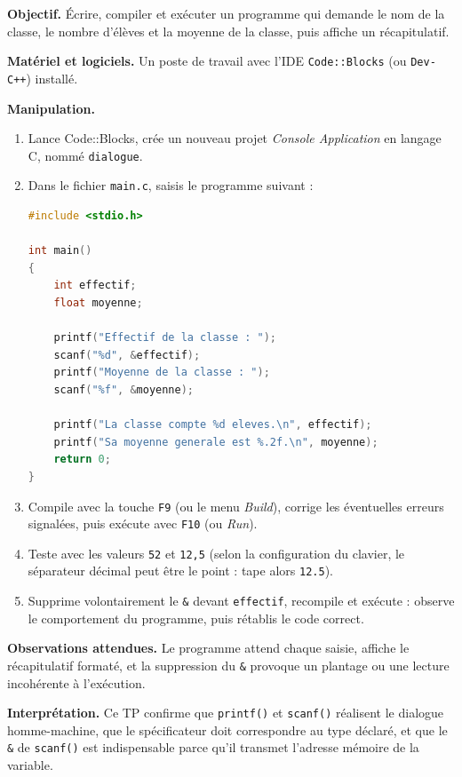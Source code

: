 \documentclass[11pt]{article}
\begin{document}
\begin{experience}
\textbf{Objectif.} Écrire, compiler et exécuter un programme qui demande le nom de la classe, le nombre d'élèves et la moyenne de la classe, puis affiche un récapitulatif.

\textbf{Matériel et logiciels.} Un poste de travail avec l'IDE \texttt{Code::Blocks} (ou \texttt{Dev-C++}) installé.

\textbf{Manipulation.}
\begin{enumerate}
\item Lance Code::Blocks, crée un nouveau projet \emph{Console Application} en langage C, nommé \texttt{dialogue}.
\item Dans le fichier \texttt{main.c}, saisis le programme suivant :
\begin{lstlisting}[language=C]
#include <stdio.h>

int main()
{
    int effectif;
    float moyenne;

    printf("Effectif de la classe : ");
    scanf("%d", &effectif);
    printf("Moyenne de la classe : ");
    scanf("%f", &moyenne);

    printf("La classe compte %d eleves.\n", effectif);
    printf("Sa moyenne generale est %.2f.\n", moyenne);
    return 0;
}
\end{lstlisting}
\item Compile avec la touche \texttt{F9} (ou le menu \emph{Build}), corrige les éventuelles erreurs signalées, puis exécute avec \texttt{F10} (ou \emph{Run}).
\item Teste avec les valeurs \texttt{52} et \texttt{12,5} (selon la configuration du clavier, le séparateur décimal peut être le point : tape alors \texttt{12.5}).
\item Supprime volontairement le \texttt{\&} devant \texttt{effectif}, recompile et exécute : observe le comportement du programme, puis rétablis le code correct.
\end{enumerate}
\textbf{Observations attendues.} Le programme attend chaque saisie, affiche le récapitulatif formaté, et la suppression du \texttt{\&} provoque un plantage ou une lecture incohérente à l'exécution.

\textbf{Interprétation.} Ce TP confirme que \texttt{printf()} et \texttt{scanf()} réalisent le dialogue homme-machine, que le spécificateur doit correspondre au type déclaré, et que le \texttt{\&} de \texttt{scanf()} est indispensable parce qu'il transmet l'adresse mémoire de la variable.
\end{experience}
\end{document}
